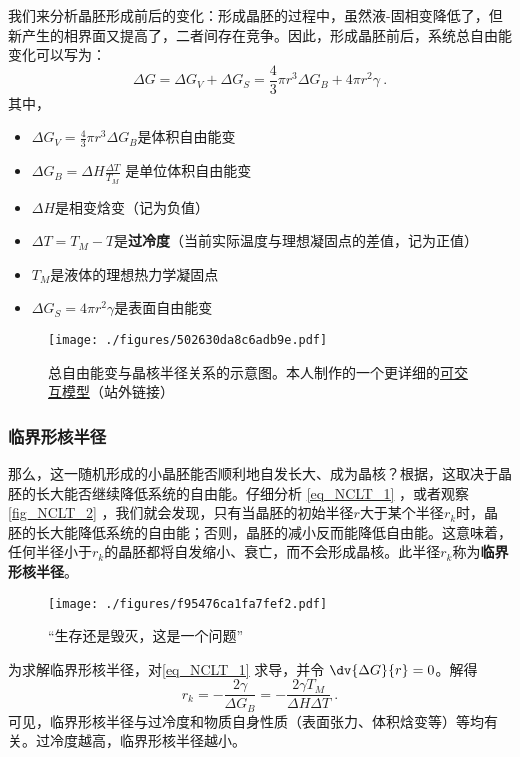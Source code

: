 我们来分析晶胚形成前后的变化：形成晶胚的过程中，虽然液-固相变降低了，但新产生的相界面又提高了，二者间存在竞争。因此，形成晶胚前后，系统总自由能变化可以写为： 
\begin{equation}\label{eq_NCLT_1}
\Delta G  = \Delta G_V +\Delta G_S = \frac{4}{3}\pi r^3 \Delta G_B + 4\pi r^2 \gamma ~.
\end{equation}
其中，
\begin{itemize}
\item $\Delta G_V = \frac{4}{3}\pi r^3 \Delta G_B$是体积自由能变
\item $\Delta G_B = \Delta H \frac{\Delta T}{T_M}$ 是单位体积自由能变
\item $\Delta H$是相变焓变（记为负值）
\item $\Delta T=T_M-T$是\textbf{过冷度}（当前实际温度与理想凝固点的差值，记为正值）
\item $T_M$是液体的理想热力学凝固点
\item $\Delta G_S = 4\pi r^2 \gamma$是表面自由能变
\end{itemize}

\begin{figure}[ht]
\centering
\texttt{[image: ./figures/502630da8c6adb9e.pdf]}
\caption{总自由能变与晶核半径关系的示意图。本人制作的一个更详细的\href{https://www.geogebra.org/m/prktxhhk}{可交互模型}（站外链接）} \label{fig_NCLT_2}
\end{figure}

\subsubsection{临界形核半径}
那么，这一随机形成的小晶胚能否顺利地自发长大、成为晶核？根据，这取决于晶胚的长大能否继续降低系统的自由能。仔细分析 \autoref{eq_NCLT_1} ，或者观察\autoref{fig_NCLT_2} ，我们就会发现，只有当晶胚的初始半径$r$大于某个半径$r_k$时，晶胚的长大能降低系统的自由能；否则，晶胚的减小反而能降低自由能。这意味着，任何半径小于$r_k$的晶胚都将自发缩小、衰亡，而不会形成晶核。此半径$r_k$称为\textbf{临界形核半径}。
\begin{figure}[ht]
\centering
\texttt{[image: ./figures/f95476ca1fa7fef2.pdf]}
\caption{“生存还是毁灭，这是一个问题”} \label{fig_NCLT_3}
\end{figure}

为求解临界形核半径，对\autoref{eq_NCLT_1} 求导，并令 $\dv{\Delta G}{r} = 0$。解得
\begin{equation}
r_k=-\frac{2\gamma}{\Delta G_B}=-\frac{2\gamma T_M}{\Delta H \Delta T}~.
\end{equation}
可见，临界形核半径与过冷度和物质自身性质（表面张力、体积焓变等）等均有关。过冷度越高，临界形核半径越小。

